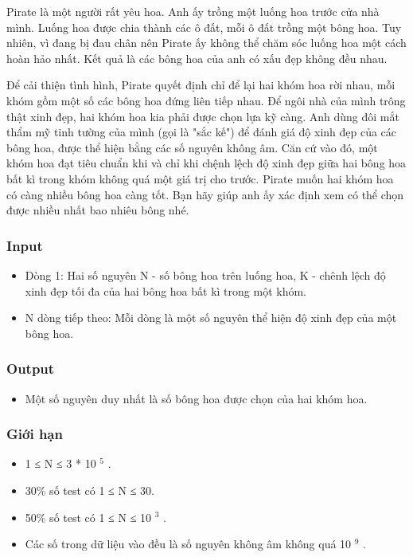 



   Pirate là một người rất yêu hoa. Anh ấy trồng một luống hoa trước cửa nhà mình. Luống hoa được chia thành các ô đất, mỗi ô đất trồng một bông hoa. Tuy nhiên, vì đang bị đau chân nên Pirate ấy không thể chăm sóc luống hoa một cách hoàn hảo nhất. Kết quả là các bông hoa của anh có xấu đẹp không đều nhau.  

   Để cải thiện tình hình, Pirate quyết định chỉ để lại hai khóm hoa rời nhau, mỗi khóm gồm một số các bông hoa đứng liên tiếp nhau. Để ngôi nhà của mình trông thật xinh đẹp, hai khóm hoa kia phải được chọn lựa kỹ càng. Anh dùng đôi mắt thẩm mỹ tinh tường của mình (gọi là "sắc kế") để đánh giá độ xinh đẹp của các bông hoa, được thể hiện bằng các số nguyên không âm. Căn cứ vào đó, một khóm hoa đạt tiêu chuẩn khi và chỉ khi chệnh lệch độ xinh đẹp giữa hai bông hoa bất kì trong khóm không quá một giá trị cho trước. Pirate muốn hai khóm hoa có càng nhiều bông hoa càng tốt. Bạn hãy giúp anh ấy xác định xem có thể chọn được nhiều nhất bao nhiêu bông nhé.  

\subsubsection{   Input  }
\begin{itemize}
	\item     Dòng 1: Hai số nguyên N - số bông hoa trên luống hoa, K - chênh lệch độ xinh đẹp tối đa của hai bông hoa bất kì trong một khóm.   
	\item     N dòng tiếp theo: Mỗi dòng là một số nguyên thể hiện độ xinh đẹp của một bông hoa.   
\end{itemize}

\subsubsection{   Output  }
\begin{itemize}
	\item     Một số nguyên duy nhất là số bông hoa được chọn của hai khóm hoa.   
\end{itemize}

\subsubsection{   Giới hạn  }
\begin{itemize}
	\item     1 ≤ N ≤ 3 * 10    $^     5    $    .   
	\item     30\% số test có 1 ≤ N ≤ 30.   
	\item     50\% số test có 1 ≤ N ≤ 10    $^     3    $    .   
	\item     Các số trong dữ liệu vào đều là số nguyên không âm không quá 10    $^     9    $    .   
\end{itemize}

